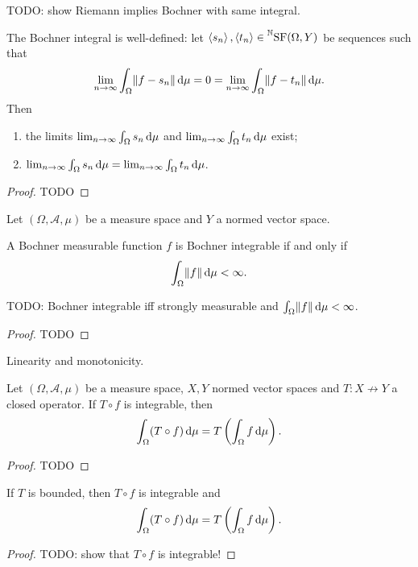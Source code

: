 TODO: show Riemann implies Bochner with same integral.

\begin{lemma}
The Bochner integral is well-defined: let $\left\langle s_n \right\rangle,\left\langle t_n \right\rangle\in \prescript{\mathbb{N}}{}{\operatorname{SF}(\Omega,Y)}$ be sequences such that
\[ \lim_{n\to\infty}\int_\Omega \lVert f-s_n\rVert\operatorname{d \!}{\mu} = 0 = \lim_{n\to\infty}\int_\Omega \lVert f-t_n\rVert\operatorname{d \!}{\mu}.  \]
Then
\begin{enumerate}
\item the limits $\lim_{n\to\infty}\int_\Omega s_n\operatorname{d \!}{\mu}$ and $\lim_{n\to\infty}\int_\Omega t_n\operatorname{d \!}{\mu}$ exist;
\item $\lim_{n\to\infty}\int_\Omega s_n\operatorname{d \!}{\mu} = \lim_{n\to\infty}\int_\Omega t_n\operatorname{d \!}{\mu}$.
\end{enumerate}
\end{lemma}
\begin{proof}
TODO
\end{proof}

\begin{proposition} \label{BochnerIntegrabilityCondition}
Let $(\Omega, \mathcal{A},\mu)$ be a measure space and $Y$ a normed vector space.

A Bochner measurable function $f$ is Bochner integrable \textup{if and only if}
\[ \int_\Omega \lVert f\rVert \operatorname{d \!}{\mu} < \infty. \]
\end{proposition}
TODO: Bochner integrable iff strongly measurable and $\int_\Omega \lVert f\rVert \operatorname{d \!}{\mu} < \infty$.
\begin{proof}
TODO
\end{proof}

\begin{proposition}
Linearity and monotonicity.
\end{proposition}

\begin{theorem} \label{HilleTheorem}
Let $(\Omega, \mathcal{A},\mu)$ be a measure space, $X,Y$ normed vector spaces and $T: X\not\to Y$ a closed operator. If $T\circ f$ is integrable, then
\[ \int_\Omega (T\circ f)\operatorname{d \!}{\mu} = T\left(\int_\Omega f\operatorname{d \!}{\mu}\right). \]
\end{theorem}
\begin{proof}
TODO
\end{proof}
\begin{corollary} \label{boundedOperatorUnderIntegral}
If $T$ is bounded, then $T\circ f$ is integrable and
\[ \int_\Omega (T\circ f)\operatorname{d \!}{\mu} = T\left(\int_\Omega f\operatorname{d \!}{\mu}\right). \]
\end{corollary}
\begin{proof}
TODO: show that $T\circ f$ is integrable!
\end{proof}

